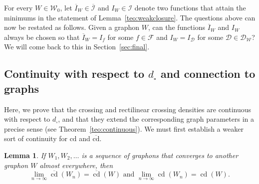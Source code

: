 \documentclass{article}
\newcounter{contSect} \numberwithin{contSect}{section}
\newtheorem{lemma}[contSect]{Lemma}
\begin{document}
For every $W\in\mathcal{W}_0$, let $\overline{I}_W\in\overline{\mathcal{I}}$ and $I_W\in\mathcal{I}$ denote two functions that attain the minimums in the statement of Lemma~\ref{teo:weakclosure}. The questions above can now be restated as follows. Given a graphon $W$, can the functions $\overline{I}_W$ and $I_W$ always be chosen so that $\overline{I}_W=I_f$ for some $f\in\mathcal{F}$ and $I_W=I_\mathcal{D}$ for some $\mathcal{D}\in\mathcal{D}_\mathcal{W}$? We will come back to this in Section~\ref{sec:final}.

\subsection{Continuity with respect to \texorpdfstring{$d_\square$}{TEXT} and connection to graphs}

Here, we prove that the crossing and rectilinear crossing densities are continuous with respect to $d_\square$, and that they extend the corresponding graph parameters in a precise sense (see Theorem~\ref{teo:continuous}). We must first establish a weaker sort of continuity for $\text{cd}$ and $\overline{\text{cd}}$.

\begin{lemma}\label{teo:pointwise}
    If $W_1,W_2,\dots$ is a sequence of graphons that converges to another graphon $W$ almost everywhere, then \[\lim_{n\rightarrow\infty}\overline{\mathop{\mathrm{cd}}}(W_n)=\overline{\mathop{\mathrm{cd}}}(W)\text{ and } \lim_{n\rightarrow\infty}\mathop{\mathrm{cd}}(W_n)=\mathop{\mathrm{cd}}(W).\]
\end{lemma}
\end{document}

